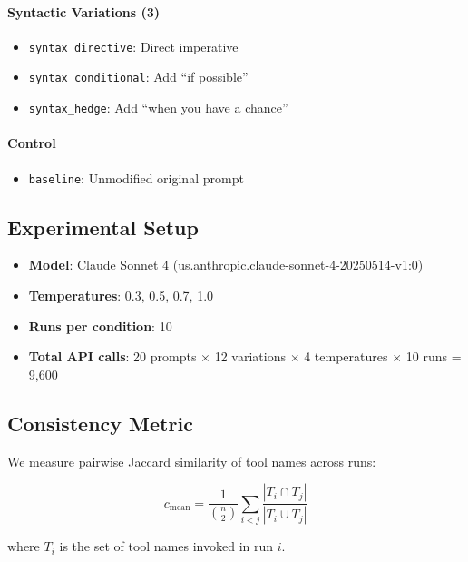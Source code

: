\documentclass[11pt]{article}
\begin{document}
\paragraph{Syntactic Variations (3)}
\begin{itemize}
    \item \texttt{syntax\_directive}: Direct imperative
    \item \texttt{syntax\_conditional}: Add ``if possible''
    \item \texttt{syntax\_hedge}: Add ``when you have a chance''
\end{itemize}

\paragraph{Control}
\begin{itemize}
    \item \texttt{baseline}: Unmodified original prompt
\end{itemize}

\subsection{Experimental Setup}

\begin{itemize}
    \item \textbf{Model}: Claude Sonnet 4 (us.anthropic.claude-sonnet-4-20250514-v1:0)
    \item \textbf{Temperatures}: 0.3, 0.5, 0.7, 1.0
    \item \textbf{Runs per condition}: 10
    \item \textbf{Total API calls}: 20 prompts $\times$ 12 variations $\times$ 4 temperatures $\times$ 10 runs = 9,600
\end{itemize}

\subsection{Consistency Metric}

We measure pairwise Jaccard similarity of tool names across runs:

\begin{equation}
c_{\text{mean}} = \frac{1}{\binom{n}{2}} \sum_{i<j} \frac{|T_i \cap T_j|}{|T_i \cup T_j|}
\end{equation}

where $T_i$ is the set of tool names invoked in run $i$.
\end{document}
